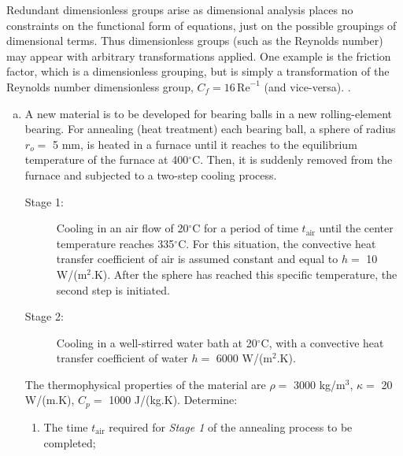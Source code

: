 \documentclass[calculator,datasheet,handbook,solutions]{exam}
\begin{document}
{\begin{question}
\begin{enumerate}[a)]
{        Redundant dimensionless groups arise as dimensional analysis
        places no constraints on the functional form of equations,
        just on the possible groupings of dimensional terms. Thus
        dimensionless groups (such as the Reynolds number) may appear
        with arbitrary transformations applied. One example is the
        friction factor, which is a dimensionless grouping, but is
        simply a transformation of the Reynolds number dimensionless
        group, $C_f=16\,\text{Re}^{-1}$ (and
        vice-versa). .  }
    \end{enumerate}
  \end{question}
}

\pagebreak 
\begin{question}
%  
  \begin{enumerate}[(a)]
    \item A new material is to be developed for bearing balls in a new rolling-element bearing. For annealing (heat treatment) each bearing ball, a sphere of radius $r_{o} =$ 5 mm, is heated in a furnace until it reaches to the equilibrium temperature of the furnace at 400$^{\circ}$C. Then, it is suddenly removed from the furnace and subjected to a two-step cooling process.
   \begin{description}
      \item[Stage 1:] Cooling in an air flow of 20$^{\circ}$C for a period of time $t_{\text{air}}$ until the center temperature reaches 335$^{\circ}$C. For this situation, the convective heat transfer coefficient of air is assumed constant and equal to $h =$ 10 W/(m$^{2}$.K). After the sphere has reached this specific temperature, the second step is initiated. 
      \item[Stage 2:] Cooling in a well-stirred water bath at 20$^{\circ}$C, with a convective heat transfer coefficient of water $h =$ 6000 W/(m$^{2}$.K). 
   \end{description}
   The thermophysical properties of the material are $\rho =$ 3000 kg/m$^{3}$, $\kappa =$ 20 W/(m.K), $C_{p} =$ 1000 J/(kg.K). Determine:
   \begin{enumerate}%
      \item The time $t_{\text{air}}$ required for {\it Stage 1} of the annealing process to be completed;
\end{enumerate}
\end{enumerate}
\end{question}
\end{document}
